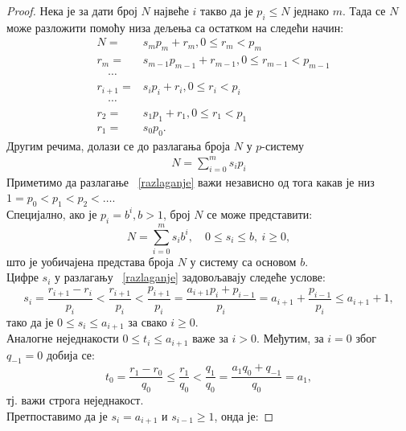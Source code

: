 \documentclass[a4paper]{article}
\begin{document}
\begin{proof}
	Нека је за дати број $ N $ највеће $ i $ такво да је $ p_{i} \leq N $ једнако $ m $. Тада се $ N $ може разложити помоћу низа дељења са остатком на следећи начин:
		\begin{eqnarray*}
			&N = &s_{m}p_{m} + r_{m}, 0 \leq r_{m} < p_{m}\\
			&r_{m} = &s_{m-1}p_{m-1} + r_{m-1}, 0 \leq r_{m-1} < p_{m-1}\\
			& \quad \cdots&\\
			&r_{i+1} = &s_{i}p_{i} + r_{i}, 0 \leq r_{i} < p_{i}\\
			& \quad \cdots&\\
			&r_{2} =& s_{1}p_{1} + r_{1}, 0 \leq r_{1} < p_{1}\\
			&r_{1} =& s_{0}p_{0}. 
		\end{eqnarray*}
	Другим речима, долази се до разлагања броја $ N $ у $ p $-систему 
		\begin{eqnarray}
			 \label{razlaganje} N = \sum_{i=0}^{m} s_{i}p_{i} 
		\end{eqnarray}
	Приметимо да разлагање ~\eqref{razlaganje} важи независно од тога какав је низ $ 1 = p_{0} < p_{1} < p_{2} < \ldots $.\\
	Специјално, ако је $ p_{i} = b^{i}, b > 1 $, број $ N $ се може представити:
		\begin{displaymath}
			N = \sum_{i=0}^{m} s_{i}b^{i},\quad 0 \leq s_{i} \le b,\ i \geq 0,
		\end{displaymath}
	што је уобичајена представа броја $ N $ у систему са основом $ b $.\\
	Цифре $ s_{i} $ у разлагању ~\eqref{razlaganje} задовољавају следеће услове:	
		\begin{displaymath}
			s_{i} = \frac{r_{i+1} - r_{i}}{p_{i}} < \frac{r_{i+1}}{p_{i}} < \frac{p_{i+1}}{p_{i}} = \frac{a_{i+1}p_{i}+p_{i-1}}{p_{i}} = a_{i+1} + \frac{p_{i-1}}{p_{i}} \leq a_{i+1} + 1, 
		\end{displaymath} 	 
	тако да је $ 0 \leq s_{i} \leq a_{i+1} $ за свако $ i \geq 0 $.\\
	Аналогне неједнакости $ 0 \le t_{i} \le a_{i+1} $ важе за $ i > 0 $. Међутим, за $ i = 0 $ због $ q_{-1} = 0 $ добија се:
		\begin{displaymath} 
			t_0=\frac{r_1-r_0}{q_0}\le \frac{r_1}{q_0} < \frac{q_1}{q_0}=
			\frac{a_1 q_0+q_{-1}}{q_0}=a_1,
		\end{displaymath}
	тј. важи строга неједнакост.\\
	Претпоставимо да је $ s_{i} = a_{i+1} $ и $ s_{i-1} \geq 1 $, онда је: 

\end{proof}
\end{document}

